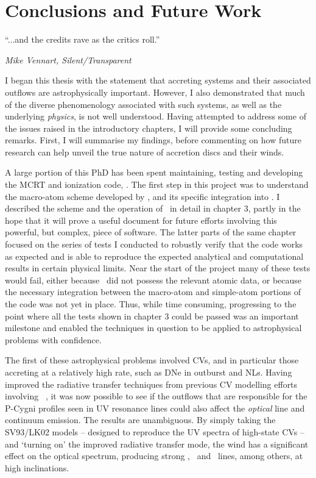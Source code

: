 \chapter{Conclusions and Future Work}

\epigraph{``...and the credits rave as the critics roll.''}
{{\sl Mike Vennart, Silent/Transparent}}

I began this thesis with the statement that accreting systems
and their associated outflows are astrophysically important. However, I also
demonstrated that much of the diverse phenomenology associated with such systems, as well
as the underlying {\em physics}, is not well understood.  
Having attempted to address some of the issues raised in the 
introductory chapters, I will provide some concluding remarks. 
First, I will summarise my findings, before 
commenting on how future research can help unveil the true nature of 
accretion discs and their winds.

A large portion of this PhD has been spent maintaining,
testing and developing the MCRT and ionization code, \py. The first 
step in this project was to understand the macro-atom scheme
developed by \cite{lucy2002,lucy2003}, and its specific integration
into \py. I described the scheme and the operation of \py\ in detail
in chapter 3, partly in the hope that it will prove a useful document
for future efforts involving this powerful, but complex, piece of software.
The latter parts of the same chapter focused on the series of tests
I conducted to robustly verify that the code works as expected and 
is able to reproduce the expected analytical and computational results in certain
physical limits. Near the start of the project many of these tests
would fail, either because \py\ did not possess the relevant atomic data,
or because the necessary integration between the macro-atom and simple-atom
portions of the code was not yet in place. Thus, while time consuming,
progressing to the point where all the tests shown in chapter 3 could be
passed was an important milestone and enabled the techniques in question
to be applied to astrophysical problems with confidence.

The first of these astrophysical problems involved CVs, and in particular
those accreting at a relatively high rate, such as DNe in outburst and NLs. Having 
improved the radiative transfer techniques from previous CV modelling efforts
involving \py\ \citep[LK02, ][]{noebauer}, it was now possible to see
if the outflows that are responsible for the P-Cygni profiles seen
in UV resonance lines could also affect the {\em optical} line and continuum
emission. The results are unambiguous. By simply taking the SV93/LK02
models -- designed to reproduce the UV spectra of high-state CVs --
and `turning on' the improved radiative transfer mode, the wind
has a significant effect on the optical spectrum, producing strong
\ha, \heiiopt\ and \heiioptnew\ lines, among others, at high inclinations.

